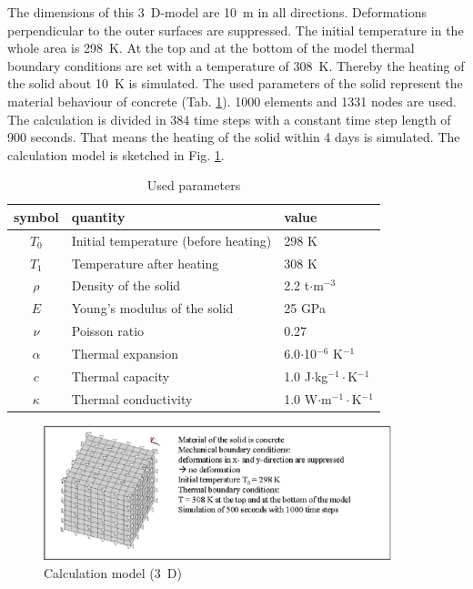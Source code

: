 The dimensions of this 3~D-model are 10~m in all directions. Deformations perpendicular to the outer surfaces are suppressed. The initial temperature in the whole area is 298~K. At the top and at the bottom of the model thermal boundary conditions are set with a temperature of 308~K. Thereby the heating of the solid about 10~K is simulated. The used parameters of the solid represent the material behaviour of concrete (Tab. \ref{tab61}). 1000 elements and 1331 nodes are used. The calculation is divided in 384 time steps with a constant time step length of 900 seconds. That means the heating of the solid within 4 days is simulated. The calculation model is sketched in Fig. \ref{fig62}.
\begin{table}[htbp]
\centering
\begin{tabular}{|c|l|l|}
\hline
symbol & quantity & value \\
\hline
$T_0$  & Initial temperature (before heating) & 298 K \\
\hline
$T_1$  & Temperature after heating & 308 K \\
\hline
$\rho$  & Density of the solid &  2.2 t$\cdot$m$^{-3}$  \\			
\hline
$E$ & Young's modulus of the solid & 25 GPa \\
\hline
$\nu$ & Poisson ratio & 0.27 \\
\hline
$\alpha$ & Thermal expansion & 6.0$\cdot$10$^{-6}$ K$^{-1}$ \\
\hline
$c$      & Thermal capacity & 1.0 J$\cdot$kg$^{-1}\cdot$K$^{-1}$ \\
\hline
$\kappa$ & Thermal conductivity & 1.0 W$\cdot$m$^{-1}\cdot$K$^{-1}$ \\
\hline
\end{tabular}
\caption{Used parameters}
\label{tab61}
\end{table}

\begin{figure}[htbp]
\centering
\includegraphics[width=0.9\textwidth]{TM/figures/fig62.eps}
\caption{Calculation model (3~D)}
\label{fig62}
\end{figure}

